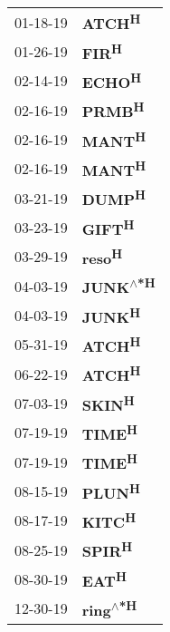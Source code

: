 \begin{supertabular}{p{0.08\textwidth}p{0.2\textwidth}}
 01-18-19 &           \textbf{ATCH\textsuperscript{H}} \\
 01-26-19 &            \textbf{FIR\textsuperscript{H}} \\
 02-14-19 &           \textbf{ECHO\textsuperscript{H}} \\
 02-16-19 &           \textbf{PRMB\textsuperscript{H}} \\
 02-16-19 &           \textbf{MANT\textsuperscript{H}} \\
 02-16-19 &           \textbf{MANT\textsuperscript{H}} \\
 03-21-19 &           \textbf{DUMP\textsuperscript{H}} \\
 03-23-19 &           \textbf{GIFT\textsuperscript{H}} \\
 03-29-19 &           \textbf{reso\textsuperscript{H}} \\
 04-03-19 &  \textbf{JUNK\textsuperscript{$\wedge$*H}} \\
 04-03-19 &           \textbf{JUNK\textsuperscript{H}} \\
 05-31-19 &           \textbf{ATCH\textsuperscript{H}} \\
 06-22-19 &           \textbf{ATCH\textsuperscript{H}} \\
 07-03-19 &           \textbf{SKIN\textsuperscript{H}} \\
 07-19-19 &           \textbf{TIME\textsuperscript{H}} \\
 07-19-19 &           \textbf{TIME\textsuperscript{H}} \\
 08-15-19 &           \textbf{PLUN\textsuperscript{H}} \\
 08-17-19 &           \textbf{KITC\textsuperscript{H}} \\
 08-25-19 &           \textbf{SPIR\textsuperscript{H}} \\
 08-30-19 &            \textbf{EAT\textsuperscript{H}} \\
 12-30-19 &  \textbf{ring\textsuperscript{$\wedge$*H}} \\
\end{supertabular}

